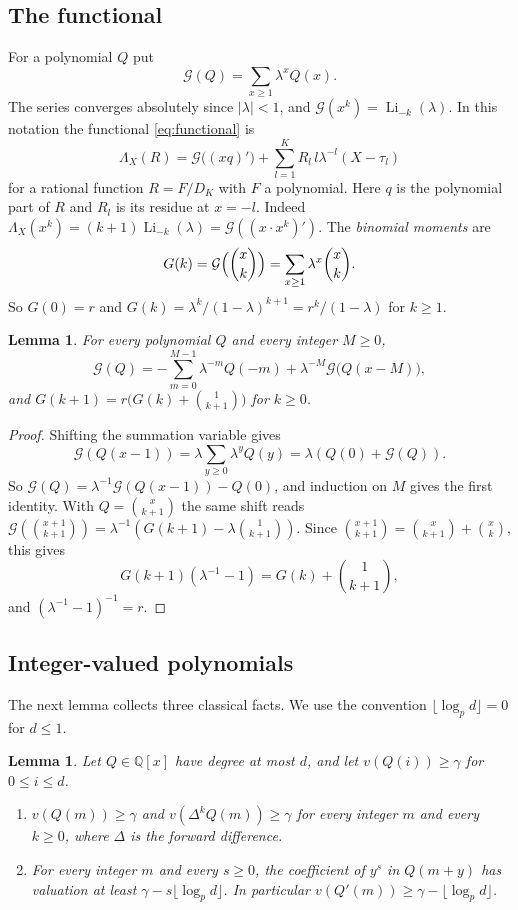 \documentclass[11pt]{amsart}
\newtheorem{lemma}[theorem]{Lemma}
\theoremstyle{definition}
\theoremstyle{remark}
\numberwithin{equation}{section}
\newcommand{\Q}{\mathbb Q}
\newcommand{\Li}{\operatorname{Li}}
\begin{document}
\subsection{The functional}\label{tp:ssec:functional}
For a polynomial $Q$ put
\[
 \mathcal G(Q)=\sum_{x\ge1}\lambda^xQ(x).
\]
The series converges absolutely since $|\lambda|<1$, and $\mathcal G(x^k)=\Li_{-k}(\lambda)$. In this notation the
functional \eqref{eq:functional} is
\begin{equation}\label{tp:eq:Lambda}
 \Lambda_X(R)=\mathcal G\bigl((xq)'\bigr)+\sum_{l=1}^{K}R_l\,l\lambda^{-l}(X-\tau_l)
\end{equation}
for a rational function $R=F/D_K$ with $F$ a polynomial. Here $q$ is the polynomial part of $R$ and $R_l$ is its residue
at $x=-l$. Indeed $\Lambda_X(x^k)=(k+1)\Li_{-k}(\lambda)=\mathcal G((x\cdot x^k)')$. The \emph{binomial moments} are
\[
 G(k)=\mathcal G\Bigl(\binom xk\Bigr)=\sum_{x\ge1}\lambda^x\binom xk .
\]
So $G(0)=r$ and $G(k)=\lambda^k/(1-\lambda)^{k+1}=r^k/(1-\lambda)$ for $k\ge1$.

\begin{lemma}\label{tp:lem:shift}
For every polynomial $Q$ and every integer $M\ge0$,
\[
 \mathcal G(Q)=-\sum_{m=0}^{M-1}\lambda^{-m}Q(-m)+\lambda^{-M}\mathcal G\bigl(Q(x-M)\bigr),
\]
and $G(k+1)=r\bigl(G(k)+\binom1{k+1}\bigr)$ for $k\ge0$.
\end{lemma}

\begin{proof}
Shifting the summation variable gives
\[
 \mathcal G(Q(x-1))=\lambda\sum_{y\ge0}\lambda^yQ(y)=\lambda(Q(0)+\mathcal G(Q)).
\]
So $\mathcal G(Q)=\lambda^{-1}\mathcal G(Q(x-1))-Q(0)$, and induction on $M$ gives the first identity. With
$Q=\binom x{k+1}$ the same shift reads $\mathcal G(\binom{x+1}{k+1})=\lambda^{-1}(G(k+1)-\lambda\binom1{k+1})$.
Since
$\binom{x+1}{k+1}=\binom x{k+1}+\binom xk$, this gives
\[
 G(k+1)(\lambda^{-1}-1)=G(k)+\binom1{k+1},
\]
and $(\lambda^{-1}-1)^{-1}=r$.
\end{proof}

\subsection{Integer-valued polynomials}
The next lemma collects three classical facts. We use the convention $\lfloor\log_pd\rfloor=0$ for $d\le1$.

\begin{lemma}\label{tp:lem:intval}
Let $Q\in\Q[x]$ have degree at most $d$, and let $v(Q(i))\ge\gamma$ for $0\le i\le d$.
\begin{enumerate}[label=(\alph*)]
\item $v(Q(m))\ge\gamma$ and $v(\Delta^kQ(m))\ge\gamma$ for every integer $m$ and every $k\ge0$, where $\Delta$ is the
 forward difference.
\item For every integer $m$ and every $s\ge0$, the coefficient of $y^s$ in $Q(m+y)$ has valuation at least
 $\gamma-s\lfloor\log_pd\rfloor$. In particular $v(Q'(m))\ge\gamma-\lfloor\log_pd\rfloor$.
\end{enumerate}
\end{lemma}
\end{document}
